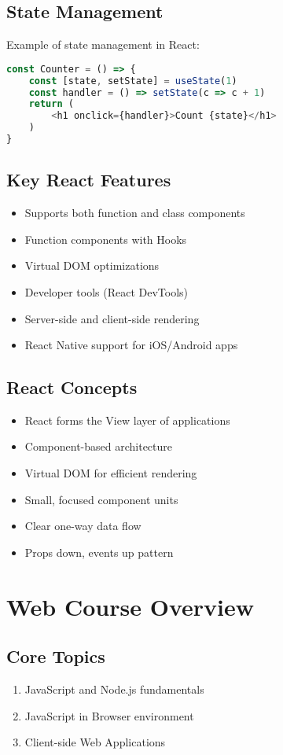 \subsection{State Management}
Example of state management in React:
\begin{lstlisting}[language=JavaScript]
const Counter = () => {
    const [state, setState] = useState(1)
    const handler = () => setState(c => c + 1)
    return (
        <h1 onclick={handler}>Count {state}</h1>
    )
}
\end{lstlisting}

\subsection{Key React Features}
\begin{itemize}
    \item Supports both function and class components
    \item Function components with Hooks
    \item Virtual DOM optimizations
    \item Developer tools (React DevTools)
    \item Server-side and client-side rendering
    \item React Native support for iOS/Android apps
\end{itemize}

\subsection{React Concepts}
\begin{itemize}
    \item React forms the View layer of applications
    \item Component-based architecture
    \item Virtual DOM for efficient rendering
    \item Small, focused component units
    \item Clear one-way data flow
    \item Props down, events up pattern
\end{itemize}

\section{Web Course Overview}

\subsection{Core Topics}
\begin{enumerate}
    \item JavaScript and Node.js fundamentals
    \item JavaScript in Browser environment
    \item Client-side Web Applications
\end{enumerate}

